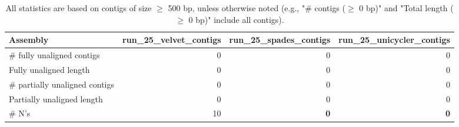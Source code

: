 \documentclass[12pt,a4paper]{article}
\begin{document}
\begin{table}[ht]
\begin{center}
\caption{All statistics are based on contigs of size $\geq$ 500 bp, unless otherwise noted (e.g., "\# contigs ($\geq$ 0 bp)" and "Total length ($\geq$ 0 bp)" include all contigs).}
\begin{tabular}{|l*{3}{|r}|}
\hline
Assembly & run\_25\_velvet\_contigs & run\_25\_spades\_contigs & run\_25\_unicycler\_contigs \\ \hline
\# fully unaligned contigs & 0 & 0 & 0 \\ \hline
Fully unaligned length & 0 & 0 & 0 \\ \hline
\# partially unaligned contigs & 0 & 0 & 0 \\ \hline
Partially unaligned length & 0 & 0 & 0 \\ \hline
\# N's & 10 & {\bf 0} & {\bf 0} \\ \hline
\end{tabular}
\end{center}
\end{table}
\end{document}

